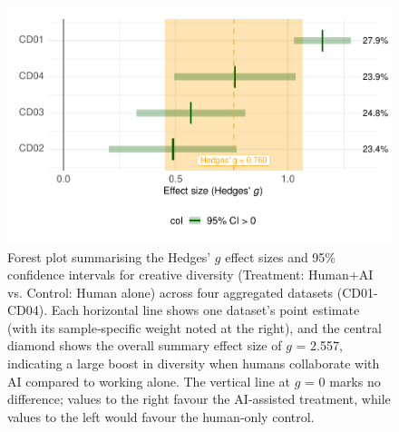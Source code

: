 \documentclass[manuscript, screen, review, acmsmall, anonymous]{acmart}
\begin{document}
\begin{figure}[H]
  \centering
  \includegraphics[width=\linewidth]{plot_diversity_agg_forest}
  \caption{Forest plot summarising the Hedges’ $g$ effect sizes and 95\% confidence intervals for creative diversity (Treatment: Human+AI vs. Control: Human alone) across four aggregated datasets (CD01-CD04). Each horizontal line shows one dataset’s point estimate (with its sample‑specific weight noted at the right), and the central diamond shows the overall summary effect size of $g$ = 2.557, indicating a large boost in diversity when humans collaborate with AI compared to working alone. The vertical line at $g$ = 0 marks no difference; values to the right favour the AI‑assisted treatment, while values to the left would favour the human‑only control.}
  \label{fig:diversity_agg_forest}
\end{figure}
\end{document}
